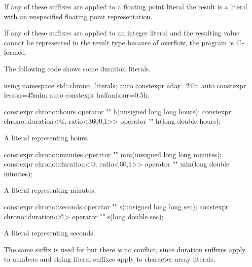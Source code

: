 \pnum
If any of these suffixes are applied to a floating point literal the result is a
 literal with an unspecified floating point representation.

\pnum
If any of these suffixes are applied to an integer literal and the resulting
 value cannot be represented in the result type because
of overflow, the program is ill-formed.

\pnum
\enterexample
The following code shows some duration literals.
\begin{codeblock}
using namespace std::chrono_literals;
auto constexpr aday=24h;
auto constexpr lesson=45min;
auto constexpr halfanhour=0.5h;
\end{codeblock}
\exitexample

\begin{itemdecl}
constexpr chrono::hours                                 operator "" h(unsigned long long hours);
constexpr chrono::duration<@\unspec@, ratio<3600,1>> operator "" h(long double hours);
\end{itemdecl}

\begin{itemdescr}
\pnum
\returns
A  literal representing  hours.
\end{itemdescr}

\begin{itemdecl}
constexpr chrono::minutes                             operator "" min(unsigned long long minutes);
constexpr chrono::duration<@\unspec@, ratio<60,1>> operator "" min(long double minutes);
\end{itemdecl}

\begin{itemdescr}
\pnum
\returns
A  literal representing  minutes.
\end{itemdescr}

\begin{itemdecl}
constexpr chrono::seconds                operator "" s(unsigned long long sec);
constexpr chrono::duration<@\unspec@> operator "" s(long double sec);
\end{itemdecl}

\begin{itemdescr}
\pnum
\returns
A  literal representing  seconds.

\pnum
\enternote
The same suffix  is used for  but there is no
conflict, since duration suffixes apply to numbers and string literal suffixes
apply to character array literals.
\exitnote
\end{itemdescr}

